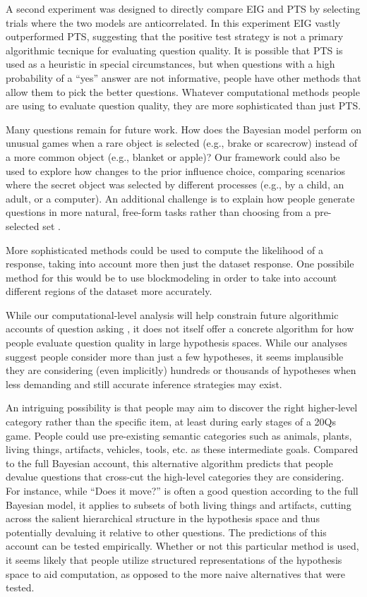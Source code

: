 \documentclass[11pt,letterpaper]{article}
\newcommand{\smalltodo}[2][] 
    {\todo[caption={#2}, #1]
    {\begin{spacing}{0.5}#2\end{spacing}}}
\begin{document}
A second experiment was designed to directly compare EIG and PTS by selecting trials where the two models are anticorrelated. In this experiment EIG vastly outperformed PTS\smalltodo{how do I report correlation in text here w/ two sets of games?}, suggesting that the positive test strategy is not a primary algorithmic tecnique for evaluating question quality. It is possible that PTS is used as a heuristic in special circumstances, but when questions with a high probability of a ``yes'' answer are not informative, people have other methods that allow them to pick the better questions. Whatever computational methods people are using to evaluate question quality, they are more sophisticated than just PTS.

Many questions remain for future work. How does the Bayesian model perform on unusual games when a rare object is selected (e.g., brake or scarecrow) instead of a more common object (e.g., blanket or apple)? Our framework could also be used to explore how changes to the prior influence choice, comparing scenarios where the secret object was selected by different processes (e.g., by a child, an adult, or a computer). An additional challenge is to explain how people generate questions in more natural, free-form tasks rather than choosing from a pre-selected set \cite{Rothe2016}. 

More sophisticated methods could be used to compute the likelihood of a response, taking into account more then just the dataset response. One possibile method for this would be to use blockmodeling \cite{brusco2013exact,brusco2013multiobjective} in order to take into account different regions of the dataset more accurately.

While our computational-level analysis will help constrain future algorithmic accounts of question asking \cite{Marr1982}, it does not itself offer a concrete algorithm for how people evaluate question quality in large hypothesis spaces. While our analyses suggest people consider more than just a few hypotheses, it seems implausible they are considering (even implicitly) hundreds or thousands of hypotheses when less demanding and still accurate inference strategies may exist.

An intriguing possibility is that people may aim to discover the right higher-level category rather than the specific item, at least during early stages of a 20Qs game. People could use pre-existing semantic categories such as animals, plants, living things, artifacts, vehicles, tools, etc. as these intermediate goals. Compared to the full Bayesian account, this alternative algorithm predicts that people devalue questions that cross-cut the high-level categories they are considering. For instance, while ``Does it move?'' is often a good question according to the full Bayesian model, it applies to subsets of both living things and artifacts, cutting across the salient hierarchical structure in the hypothesis space and thus potentially devaluing it relative to other questions. The predictions of this account can be tested empirically. Whether or not this particular method is used, it seems likely that people utilize structured representations of the hypothesis space to aid computation, as opposed to the more naive alternatives that were tested. 
\end{document}
